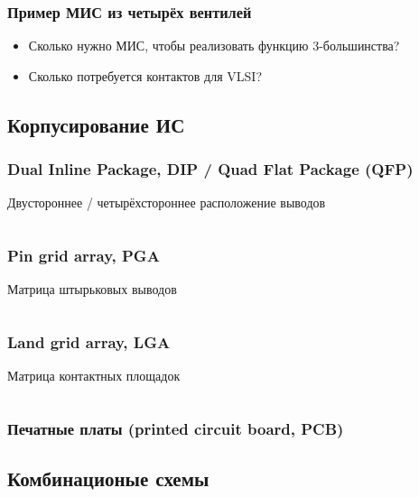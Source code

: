 \begin{frame}
\frametitle{Пример МИС из четырёх вентилей}
\pause\begin{itemize}
    \item \small Сколько нужно МИС, чтобы реализовать функцию 3-большинства?
    \item \small Сколько потребуется контактов для VLSI?
\end{itemize}
\end{frame}

\subsection{Корпусирование ИС}

\begin{frame}
\frametitle{Dual Inline Package, DIP / Quad Flat Package (QFP)}
Двустороннее / четырёхстороннее расположение выводов
\begin{columns}
    \column{6cm} 
    \column{5cm} 
\end{columns}
\end{frame}

\begin{frame}
\frametitle{Pin grid array, PGA}
Матрица штырьковых выводов
\begin{columns}
    \column{6cm} 
    \column{5cm} 
\end{columns}
\end{frame}

\begin{frame}
\frametitle{Land grid array, LGA}
Матрица контактных площадок
\begin{columns}
    \column{6cm} 
    \column{5.5cm} 
\end{columns}
\end{frame}

\begin{frame}
\frametitle{Печатные платы (printed circuit board, PCB)}
\end{frame}

\subsection{Комбинационые схемы}

